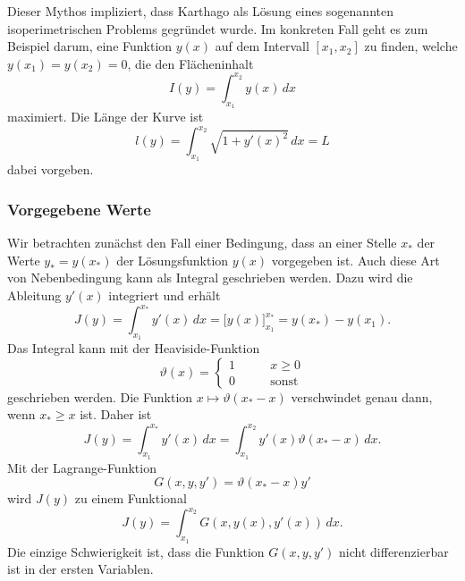 Dieser Mythos impliziert, dass Karthago als Lösung eines sogenannten
isoperimetrischen Problems gegründet wurde.
%
Im konkreten Fall geht es zum Beispiel darum, eine Funktion $y(x)$
auf dem Intervall $[x_1,x_2]$ zu finden, welche $y(x_1)=y(x_2)=0$,
die den Flächeninhalt
\[
I(y)
=
\int_{x_1}^{x_2} y(x)\,dx
\]
maximiert.
Die Länge der Kurve ist
\[
l(y)
=
\int_{x_1}^{x_2}
\sqrt{1+y'(x)^2}
\,dx
=
L
\]
dabei vorgeben.

%
%
\subsubsection{Vorgegebene Werte}
Wir betrachten zunächst den Fall einer Bedingung, dass an einer Stelle
$x_*$ der Werte $y_*=y(x_*)$ der Lösungsfunktion $y(x)$ vorgegeben ist.
Auch diese Art von Nebenbedingung kann als Integral geschrieben werden.
Dazu wird die Ableitung $y'(x)$ integriert und erhält
\[
J(y)
=
\int_{x_1}^{x_*} y'(x)\,dx
=
\biggl[y(x)\biggr]_{x_1}^{x_*}
=
y(x_*)-y(x_1).
\]
Das Integral kann mit der Heaviside-Funktion
\begin{equation}
\vartheta(x)
=
\begin{cases}
1&\qquad x\ge 0\\
0&\qquad\text{sonst}
\end{cases}
\label{buch:nebenbedingungen:lagrangemult:eqn:heaviside}
\end{equation}
geschrieben werden.
Die Funktion $x\mapsto\vartheta(x_*-x)$ verschwindet genau dann,
wenn $x_*\ge x$ ist.
Daher ist
\[
J(y)
=
\int_{x_1}^{x_*} y'(x)\,dx
=
\int_{x_1}^{x_2} y'(x)\vartheta(x_*-x)\,dx.
\]
Mit der Lagrange-Funktion
\begin{equation}
G(x,y,y')
=
\vartheta(x_*-x)
y'
\label{buch:nebenbedingungen:lagrangemult:eqn:heavilagrange}
\end{equation}
wird $J(y)$ zu einem Funktional
\[
J(y)
=
\int_{x_1}^{x_2}
G(x,y(x),y'(x))
\,dx.
\]
Die einzige Schwierigkeit ist, dass die Funktion $G(x,y,y')$ nicht
differenzierbar ist in der ersten Variablen.

%
%
